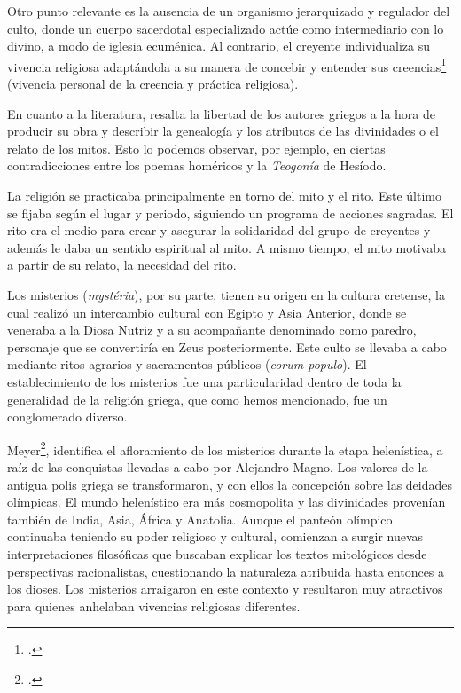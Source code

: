 Otro punto relevante es la ausencia de un organismo jerarquizado y regulador del culto, donde un cuerpo sacerdotal especializado actúe como intermediario con lo divino, a modo de iglesia ecuménica. Al contrario, el creyente individualiza su vivencia religiosa adaptándola a su manera de concebir y entender sus creencias\footcite[47]{reyesReligionGriega2018} (vivencia personal de la creencia y práctica religiosa).  

En cuanto a la literatura, resalta la libertad de los autores griegos a la hora de producir su obra y describir la genealogía y los  atributos de las divinidades o el relato de los mitos. Esto lo podemos observar, por ejemplo, en ciertas contradicciones entre los poemas homéricos y la  \textit{Teogonía} de Hesíodo. 

La religión se practicaba principalmente en torno del mito y el rito. Este último se fijaba según el lugar y periodo, siguiendo un programa de acciones sagradas. El rito era el medio para crear y asegurar la solidaridad del grupo de creyentes y además le daba un sentido espiritual al mito. A mismo tiempo, el mito motivaba a partir de su relato, la necesidad del rito.

Los misterios (\textit{mystéria}), por su parte, tienen su origen en la cultura cretense, la cual realizó un intercambio cultural con Egipto y Asia Anterior, donde se veneraba a la Diosa Nutriz y a su acompañante denominado como paredro, personaje que se convertiría en Zeus posteriormente. Este culto se llevaba a cabo mediante ritos agrarios y sacramentos públicos (\textit{corum populo}). El establecimiento de los misterios fue una particularidad dentro de toda la generalidad de la religión griega, que como hemos mencionado, fue un conglomerado diverso.

Meyer\footcite[4]{w.meyerAncientMysteriesSource1986}, identifica el afloramiento de los misterios durante la etapa helenística, a raíz de las conquistas llevadas a cabo por Alejandro Magno. Los valores de la antigua polis griega se transformaron, y con ellos la concepción sobre las deidades olímpicas. El mundo helenístico era más cosmopolita y las divinidades provenían también de India, Asia, África y Anatolia. Aunque el panteón olímpico continuaba teniendo su poder religioso y cultural, comienzan a surgir nuevas interpretaciones filosóficas que buscaban explicar los textos mitológicos desde perspectivas racionalistas, cuestionando la naturaleza atribuida hasta entonces a los dioses. Los misterios arraigaron en este contexto y resultaron muy atractivos para quienes anhelaban vivencias religiosas diferentes. 

